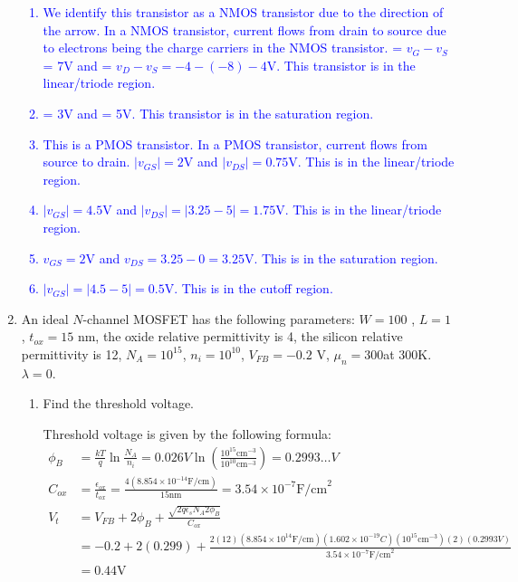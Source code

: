 \begin{enumerate}
    \textcolor{blue}{
    \begin{enumerate}
        \item We identify this transistor as a NMOS transistor due to the direction of the arrow. In a NMOS transistor, current flows from drain to source due to electrons being the charge carriers in the NMOS transistor. \vgs = $v_G - v_S$ = 7V and \vds = $v_D - v_S = -4 -(-8) - 4$V. This transistor is in the linear/triode region. 
        \item \vgs = 3V and \vds = 5V. This transistor is in the saturation region.
        \item This is a PMOS transistor. In a PMOS transistor, current flows from source to drain. $|v_{GS}|= 2$V and $|v_{DS}|= 0.75$V. This is in the linear/triode region.
        \item $|v_{GS}| = 4.5$V and $|v_{DS}| = |3.25 - 5| = 1.75$V. This is in the linear/triode region.
        \item $v_{GS} = 2$V and $v_{DS} = 3.25-0 = 3.25$V. This is in the saturation region.
        \item $|v_{GS}| = |4.5-5| = 0.5$V. This is in the cutoff region.
    \end{enumerate}
    }

    \item An ideal $N$-channel MOSFET has the following parameters: $W = 100$ \mun, $L = 1$ \mun, $t_{ox} = 15$ nm, the oxide relative permittivity is 4, the silicon relative permittivity is 12, $N_A = 10^{15}$\conc, $n_i = 10^{10}$\conc, $V_{FB} = -0.2$ V, $\mu_n = 300$\mobility at 300K. $\lambda = 0$.
    \begin{enumerate}
        \item Find the threshold voltage.
        \begin{Ans}
            Threshold voltage is given by the following formula:
            \begin{align*}
                \phi_B &= \frac{kT}{q} \ln\frac{N_A}{n_i} = 0.026 V \ln(\frac{10^{15} \mathrm{ cm}^{-3}}{10^{10} \mathrm{ cm}^{-3}}) = 0.2993 \dots V \\
                C_{ox} &= \frac{\epsilon_{ox}}{t_{ox}} = \frac{4(8.854 \times 10^{-14} \mathrm{F/cm})}{15 \mathrm{nm}} = 3.54 \times 10^{-7} \mathrm{F/cm}^2 \\
                V_t &= V_{FB} + 2\phi_B + \frac{\sqrt{2q\epsilon_s N_A 2 \phi_B}}{C_{ox}} \\
                &= -0.2 + 2(0.299) + \frac{2(12)(8.854 \times 10^{14} \mathrm{F/cm})(1.602 \times 10^{-19} C)(10^{15} \mathrm{cm}^{-3})(2)(0.2993 V)}{3.54 \times 10^{-7} \mathrm{F/cm}^2} \\
                &= 0.44 \mathrm{V}
            \end{align*}
        \end{Ans}


\end{enumerate}
\end{enumerate}
